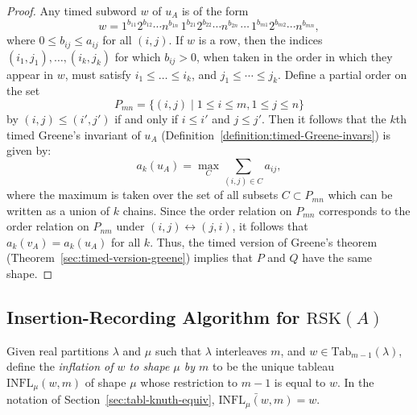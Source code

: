\documentclass[10pt]{amsproc}
\theoremstyle{definition}
\theoremstyle{remark}
\newcommand{\Tab}{\mathrm{Tab}}
\newcommand{\rsk}{\mathrm{RSK}}
\newcommand{\infl}{\mathrm{INFL}}
\begin{document}
\begin{proof}
  Any timed subword $w$ of $u_A$ is of the form
  \begin{displaymath}
    w=1^{b_{11}}2^{b_{12}}\dotsb n^{b_{1n}}\,1^{b_{21}}2^{b_{22}}\dotsb n^{b_{2n}}\,\dotsb \,1^{b_{m1}}2^{b_{m2}}\dotsb n^{b_{mn}},    
  \end{displaymath}
  where $0\leq b_{ij}\leq a_{ij}$ for all $(i,j)$.
  If $w$ is a row, then the indices $(i_1,j_1),\dotsc,(i_k,j_k)$ for which $b_{ij}>0$, when taken in the order in which they appear in $w$, must satisfy $i_1\leq \dotsc \leq i_k$, and $j_1\leq \dotsb \leq j_k$.
  Define a partial order on the set
  \begin{displaymath}
    P_{mn} = \{(i,j)\mid 1\leq i\leq m,1\leq j \leq n\}
  \end{displaymath}
  by $(i,j)\leq (i',j')$ if and only if $i\leq i'$ and $j\leq j'$.
  Then it follows that the $k$th timed Greene's invariant of $u_A$ (Definition~\ref{definition:timed-Greene-invars}) is given by:
  \begin{displaymath}
    a_k(u_A) = \max_C \sum_{(i,j)\in C} a_{ij},
  \end{displaymath}
  where the maximum is taken over the set of all subsets $C\subset P_{mn}$ which can be written as a union of $k$ chains.
  Since the order relation on $P_{mn}$ corresponds to the order relation on $P_{nm}$ under $(i,j)\leftrightarrow (j,i)$, it follows that $a_k(v_A)=a_k(u_A)$ for all $k$.
  Thus, the timed version of Greene's theorem (Theorem~\ref{sec:timed-version-greene}) implies that $P$ and $Q$ have the same shape.
\end{proof}
\subsection{Insertion-Recording Algorithm for $\rsk(A)$}
\label{sec:insert-record-algor}
Given real partitions $\lambda$ and $\mu$ such that $\lambda$ interleaves $m$, and $w\in \Tab_{m-1}(\lambda)$, define the \emph{inflation of $w$ to shape $\mu$ by $m$} to be the unique tableau $\infl_\mu(w,m)$ of shape $\mu$ whose restriction to $m-1$ is equal to $w$.
In the notation of Section~\ref{sec:tabl-knuth-equiv}, $\bar{\infl_\mu(w,m)}=w$. 
\end{document}
